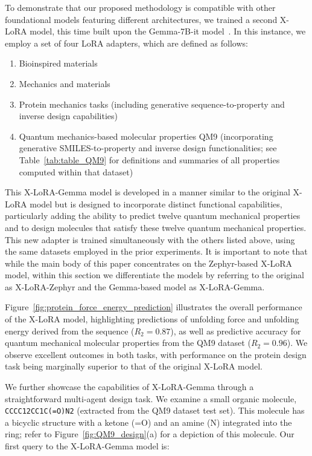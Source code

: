 To demonstrate that our proposed methodology is compatible with other foundational models featuring different architectures, we trained a second X-LoRA model, this time built upon the Gemma-7B-it model~\cite{Google/gemma-7b-itFace}. In this instance, we employ a set of four LoRA adapters, which are defined as follows:

\begin{enumerate}
    \item Bioinspired materials \item Mechanics and materials \item Protein mechanics tasks (including generative sequence-to-property and inverse design capabilities) \item Quantum mechanics-based molecular properties QM9 (incorporating generative SMILES-to-property and inverse design functionalities; see Table~\ref{tab:table_QM9} for definitions and summaries of all properties computed within that dataset)~\cite{Ruddigkeit2012EnumerationGDB-17,Ramakrishnan2015ElectronicSpace}
\end{enumerate}

This X-LoRA-Gemma model is developed in a manner similar to the original X-LoRA model but is designed to incorporate distinct functional capabilities, particularly adding the ability to predict twelve quantum mechanical properties and to design molecules that satisfy these twelve quantum mechanical properties. This new adapter is trained simultaneously with the others listed above, using the same datasets employed in the prior experiments. It is important to note that while the main body of this paper concentrates on the Zephyr-based X-LoRA model, within this section we differentiate the models by referring to the original as X-LoRA-Zephyr and the Gemma-based model as X-LoRA-Gemma.

Figure~\ref{fig:protein_force_energy_prediction} illustrates the overall performance of the X-LoRA model, highlighting predictions of unfolding force and unfolding energy derived from the sequence ($R_2 = 0.87$), as well as predictive accuracy for quantum mechanical molecular properties from the QM9 dataset ($R_2 = 0.96$). We observe excellent outcomes in both tasks, with performance on the protein design task being marginally superior to that of the original X-LoRA model.

We further showcase the capabilities of X-LoRA-Gemma through a straightforward multi-agent design task. We examine a small organic molecule, \texttt{CCCC12CC1C(=O)N2} (extracted from the QM9 dataset test set). This molecule has a bicyclic structure with a ketone (=O) and an amine (N) integrated into the ring; refer to Figure~\ref{fig:QM9_design}(a) for a depiction of this molecule. Our first query to the X-LoRA-Gemma model is:

